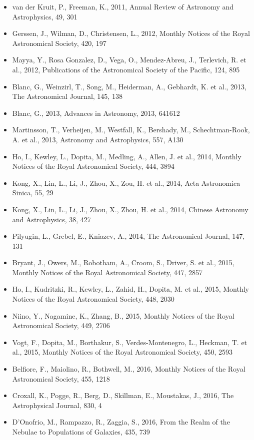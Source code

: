 \documentclass{letter}
\begin{document}
\begin{enumerate}
\begin{itemize}
\item van der Kruit, P., Freeman, K., 2011, Annual Review of Astronomy and Astrophysics, 49, 301
\item Gerssen, J., Wilman, D., Christensen, L., 2012, Monthly Notices of the Royal Astronomical Society, 420, 197
\item Mayya, Y., Rosa Gonzalez, D., Vega, O., Mendez-Abreu, J., Terlevich, R. et al., 2012, Publications of the Astronomical Society of the Pacific, 124, 895
\item Blanc, G., Weinzirl, T., Song, M., Heiderman, A., Gebhardt, K. et al., 2013, The Astronomical Journal, 145, 138
\item Blanc, G., 2013, Advances in Astronomy, 2013, 641612
\item Martinsson, T., Verheijen, M., Westfall, K., Bershady, M., Schechtman-Rook, A. et al., 2013, Astronomy and Astrophysics, 557, A130
\item Ho, I., Kewley, L., Dopita, M., Medling, A., Allen, J. et al., 2014, Monthly Notices of the Royal Astronomical Society, 444, 3894
\item Kong, X., Lin, L., Li, J., Zhou, X., Zou, H. et al., 2014, Acta Astronomica Sinica, 55, 29
\item Kong, X., Lin, L., Li, J., Zhou, X., Zhou, H. et al., 2014, Chinese Astronomy and Astrophysics, 38, 427
\item Pilyugin, L., Grebel, E., Kniazev, A., 2014, The Astronomical Journal, 147, 131
\item Bryant, J., Owers, M., Robotham, A., Croom, S., Driver, S. et al., 2015, Monthly Notices of the Royal Astronomical Society, 447, 2857
\item Ho, I., Kudritzki, R., Kewley, L., Zahid, H., Dopita, M. et al., 2015, Monthly Notices of the Royal Astronomical Society, 448, 2030
\item Niino, Y., Nagamine, K., Zhang, B., 2015, Monthly Notices of the Royal Astronomical Society, 449, 2706
\item Vogt, F., Dopita, M., Borthakur, S., Verdes-Montenegro, L., Heckman, T. et al., 2015, Monthly Notices of the Royal Astronomical Society, 450, 2593
\item Belfiore, F., Maiolino, R., Bothwell, M., 2016, Monthly Notices of the Royal Astronomical Society, 455, 1218
\item Croxall, K., Pogge, R., Berg, D., Skillman, E., Moustakas, J., 2016, The Astrophysical Journal, 830, 4
\item D'Onofrio, M., Rampazzo, R., Zaggia, S., 2016, From the Realm of the Nebulae to Populations of Galaxies, 435, 739

\end{itemize}
\end{enumerate}
\end{document}
